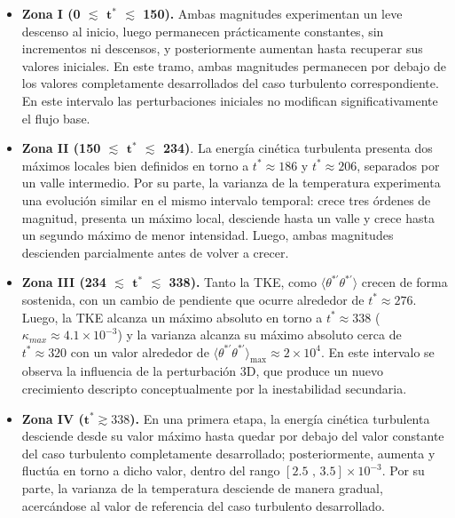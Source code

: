 \begin{itemize}
\item \textbf{Zona I (0 $\lesssim$ $\mathbf{t^*}$ $\lesssim$ 150).} Ambas magnitudes experimentan un leve descenso al inicio, luego permanecen prácticamente constantes, sin incrementos ni descensos, y posteriormente aumentan hasta recuperar sus valores iniciales. En este tramo, ambas magnitudes permanecen por debajo de los valores completamente desarrollados del caso turbulento correspondiente. En este intervalo las perturbaciones iniciales no modifican significativamente el flujo base.

\item \textbf{Zona II (150 $\lesssim$ $\mathbf{t^*}$ $\lesssim$ 234)}. La energía cinética turbulenta presenta dos máximos locales bien definidos en torno a $t^*\approx186$ y $t^*\approx206$, separados por un valle intermedio. Por su parte, la varianza de la temperatura experimenta una evolución similar en el mismo intervalo temporal: crece tres órdenes de magnitud, presenta un máximo local, desciende hasta un valle y crece hasta un segundo máximo de menor intensidad. Luego, ambas magnitudes descienden parcialmente antes de volver a crecer.

\item \textbf{Zona III (234 $\lesssim$ $\mathbf{t^*}$ $\lesssim$ 338).} Tanto la TKE, como $\langle \theta^{* \prime} \theta^{* \prime} \rangle$ crecen de forma sostenida, con un cambio de pendiente que ocurre alrededor de $t^*\approx276$. Luego, la TKE alcanza un máximo absoluto en torno a $t^*\approx338$ ($\kappa_{max} \approx 4\text{.}1 \times 10^{-3}$) y la varianza alcanza su máximo absoluto cerca de $t^*\approx320$ con un valor alrededor de $\langle \theta^{* \prime} \theta^{* \prime} \rangle_{\text{max}} \approx 2 \times 10^{4}$. En este intervalo se observa la influencia de la perturbación 3D, que produce un nuevo crecimiento descripto conceptualmente por la inestabilidad secundaria.

\item \textbf{Zona IV ($\mathbf{t^*} \gtrsim 338$).} En una primera etapa, la energía cinética turbulenta desciende desde su valor máximo hasta quedar por debajo del valor constante del caso turbulento completamente desarrollado; posteriormente, aumenta y fluctúa en torno a dicho valor, dentro del rango $\left[ 2\text{.}5 \text{ , } 3\text{.}5 \right] \times 10^{-3}$. Por su parte, la varianza de la temperatura desciende de manera gradual, acercándose al valor de referencia del caso turbulento desarrollado.
\end{itemize}


